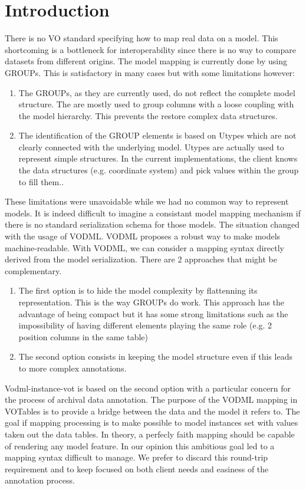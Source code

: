 \documentclass[11pt,a4paper]{ivoa}
\begin{document}
\section{Introduction}
There is no VO standard specifying how to map real data on a model. This shortcoming is a bottleneck for interoperability since there is no way to compare datasets from different origins. The model mapping is currently done by using GROUPs. This is satisfactory in many cases but with some limitations however:\begin{enumerate}
   \item The GROUPs, as they are currently used, do not reflect the complete model structure. The are mostly used to group columns with a loose coupling with the model hierarchy. This prevents the restore complex data structures.
   \item The identification of the GROUP elements is based on Utypes which are not clearly connected with the underlying model. Utypes are actually used to represent simple structures. In the current implementations, the client knows the data structures (e.g. coordinate system) and pick values within the group to fill them..
\end{enumerate}
These limitations were unavoidable while we had no common way to represent  models. It is indeed difficult to imagine a consistant model mapping mechanism if there is no standard serialization schema for those models. The situation changed with the usage of VODML. VODML proposes a robust way to make models machine-readable. With VODML, we can consider a mapping syntax directly derived from the model serialization. There are 2 approaches that might be complementary. 
\begin{enumerate}
   \item The first option is to hide the model complexity by flattenning its representation. This is the way GROUPs do work. This approach has the advantage of being compact but it has some strong limitations such as the impossibility of having different elements playing the same role (e.g. 2 position columns in the same table)
   \item The second option consists in keeping the model structure even if this leads to more complex annotations.
\end{enumerate}

Vodml-instance-vot is based on the second option with a particular concern for the process of archival data annotation. The purpose of the VODML mapping in VOTables is to provide a bridge between the data and the model it refers to. The goal if mapping processing is to make possible to model instances set with values taken out the data tables. In theory, a perfecly faith mapping should be capable of rendering any model feature. In our opinion this ambitious goal led to a mapping syntax difficult to manage.
We prefer to discard this round-trip requirement and to keep focused on both client needs and easiness of the annotation process.
\end{document}

